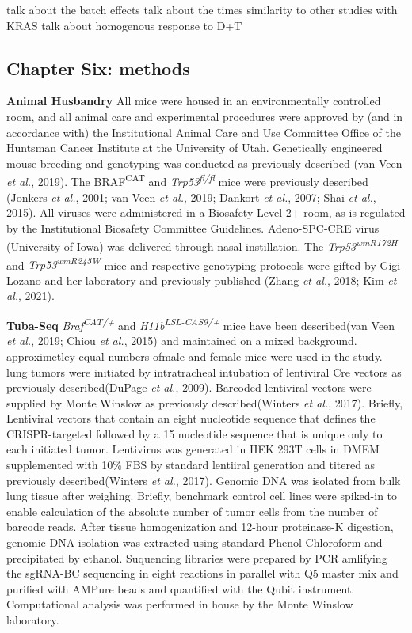 talk about the batch effects
talk about the times
similarity to other studies with KRAS
talk about homogenous response to D+T

\hypertarget{chapter-six-methods}{%
\subsection{Chapter Six: methods}\label{chapter-six-methods}}

\textbf{Animal Husbandry} All mice were housed in an environmentally controlled room, and all animal care and experimental procedures were approved by (and in accordance with) the Institutional Animal Care and Use Committee Office of the Huntsman Cancer Institute at the University of Utah. Genetically engineered mouse breeding and genotyping was conducted as previously described (van Veen \emph{et al.}, 2019). The BRAF\textsuperscript{CAT} and \emph{Trp53\textsuperscript{fl/fl}} mice were previously described (Jonkers \emph{et al.}, 2001; van Veen \emph{et al.}, 2019; Dankort \emph{et al.}, 2007; Shai \emph{et al.}, 2015). All viruses were administered in a Biosafety Level 2+ room, as is regulated by the Institutional Biosafety Committee Guidelines. Adeno-SPC-CRE virus (University of Iowa) was delivered through nasal instillation. The \emph{Trp53\textsuperscript{wmR172H}} and \emph{Trp53\textsuperscript{wmR245W}} mice and respective genotyping protocols were gifted by Gigi Lozano and her laboratory and previously published (Zhang \emph{et al.}, 2018; Kim \emph{et al.}, 2021).

\textbf{Tuba-Seq} \emph{Braf\textsuperscript{CAT/+}} and \emph{H11b\textsuperscript{LSL-CAS9/+}} mice have been described(van Veen \emph{et al.}, 2019; Chiou \emph{et al.}, 2015) and maintained on a mixed background. approximetley equal numbers ofmale and female mice were used in the study. lung tumors were initiated by intratracheal intubation of lentiviral Cre vectors as previously described(DuPage \emph{et al.}, 2009). Barcoded lentiviral vectors were supplied by Monte Winslow as previously described(Winters \emph{et al.}, 2017). Briefly, Lentiviral vectors that contain an eight nucleotide sequence that defines the CRISPR-targeted followed by a 15 nucleotide sequence that is unique only to each initiated tumor. Lentivirus was generated in HEK 293T cells in DMEM supplemented with 10\% FBS by standard lentiiral generation and titered as previously described(Winters \emph{et al.}, 2017). Genomic DNA was isolated from bulk lung tissue after weighing. Briefly, benchmark control cell lines were spiked-in to enable calculation of the absolute number of tumor cells from the number of barcode reads. After tissue homogenization and 12-hour proteinase-K digestion, genomic DNA isolation was extracted using standard Phenol-Chloroform and precipitated by ethanol. Suquencing libraries were prepared by PCR amlifying the sgRNA-BC sequencing in eight reactions in parallel with Q5 master mix and purified with AMPure beads and quantified with the Qubit instrument. Computational analysis was performed in house by the Monte Winslow laboratory.

